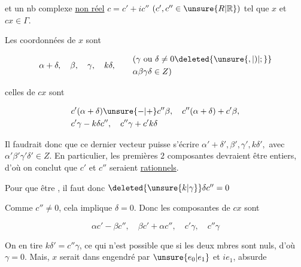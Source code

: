 et un nb complexe \uline{non réel} $c=c'+ic''$ $(c',c''\in\unsure{R|\mathbb{R}})$ tel que $x$ et $cx\in\Gamma$. 

Les coordonnées de $x$ sont

\[ \alpha+\delta,\quad\beta,\quad\gamma,\quad k\delta,\qquad
\begin{aligned} &(\gamma\text{ ou }\delta\ne0\deleted{\unsure{,|)|;}}\\ &\alpha\beta\gamma\delta\in Z) \end{aligned} \]

celles \deleted{$\unsure{\beta|\gamma|\substack{\beta\\\gamma\\\delta}}$} de $cx$ sont

\[ \begin{aligned} &c'(\alpha+\delta)\unsure{-|+}c''\beta,\quad c''(\alpha+\delta)+c'\beta,\\
&c'\gamma-k\delta c'',\quad c''\gamma+c'k\delta \end{aligned} \]

Il faudrait donc que ce dernier vecteur puisse s'écrire $\alpha'+\delta',\beta',\gamma',k\delta',$ avec $\alpha'\beta'\gamma'\delta'\in Z$. En particulier, les premières $2$ composantes devraient être entiers, d'où on conclut que $c'$ et $c''$ seraient \uline{rationnels}.

Pour que       être , il faut donc $\deleted{\unsure{k|\gamma}}\delta c''=0$ 

Comme $c''\ne0$, cela implique $\delta=0$. Donc les composantes de $cx$ sont

\[ \alpha c'-\beta c'',\quad\beta c'+\alpha c'',\quad c'\gamma,\quad c''\gamma \]

On en tire $k\delta'=c''\gamma$, ce qui n'est possible que si les deux mbres sont nuls, d'où $\gamma=0$. Mais,   $x$ serait dans  engendré par $\unsure{e_0|e_1}$ et $ie_1$, absurde
